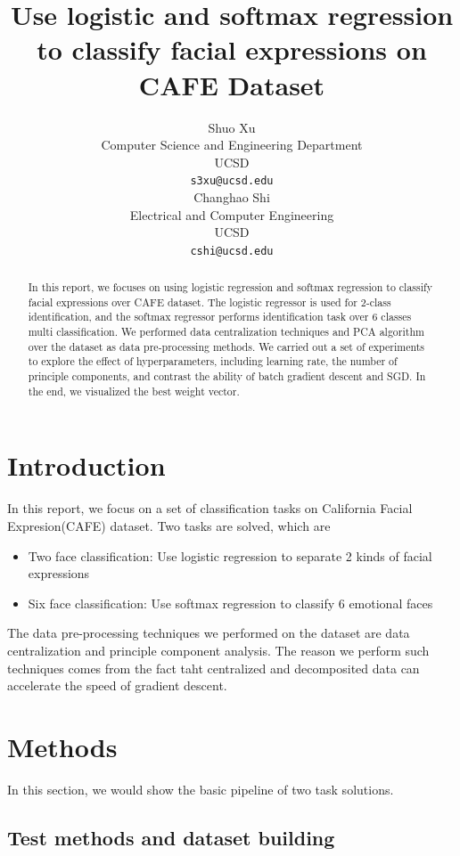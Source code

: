 \documentclass{article} %
\title{Use logistic and softmax regression to classify facial expressions on CAFE Dataset}
\author{
Shuo Xu \\
Computer Science and Engineering Department \\
UCSD \\
\texttt{s3xu@ucsd.edu} \\
\And
Changhao Shi \\
Electrical and Computer Engineering \\
UCSD \\
\texttt{cshi@ucsd.edu} \\
}
\begin{document}
\maketitle

\begin{abstract}
In this report, we focuses on using logistic regression and softmax regression to classify facial expressions over CAFE dataset.
The logistic regressor is used for 2-class identification, and the softmax regressor performs identification task over 6 classes multi classification.
We performed data centralization techniques and PCA algorithm over the dataset as data pre-processing methods. We carried out a set of experiments to 
explore the effect of hyperparameters, including learning rate, the number of principle components, and contrast the ability of batch gradient descent and SGD.
In the end, we visualized the best weight vector.
\end{abstract}

\section{Introduction}

In this report, we focus on a set of classification tasks on California Facial Expresion(CAFE) dataset.
Two tasks are solved, which are

\begin{itemize}
    \item Two face classification: Use logistic regression to separate 2 kinds of facial expressions
    \item Six face classification: Use softmax regression to classify 6 emotional faces
\end{itemize}

The data pre-processing techniques we performed on the dataset are data centralization and principle component analysis.
The reason we perform such techniques comes from the fact taht centralized and decomposited data can accelerate the speed of gradient descent. 

\section{Methods}
In this section, we would show the basic pipeline of two task solutions.

\subsection{Test methods and dataset building}
\end{document}
